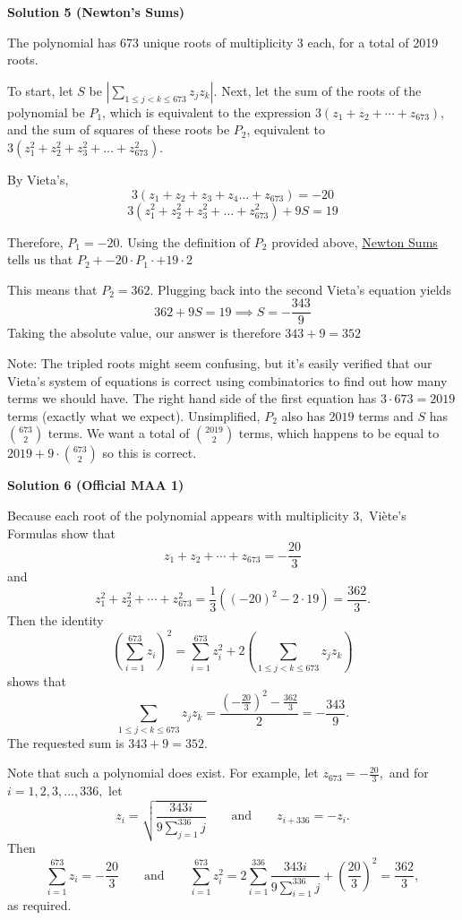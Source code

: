 \begin{enumerate}
\textbf{Solution 5 (Newton's Sums)}

The polynomial has 673 unique roots of multiplicity 3 each, for a total of 2019 roots.

 To start, let $S$ be $\left| \sum_{1 \le j <k \le 673} z_jz_k \right|$. Next, let the sum of the roots of the polynomial be $P_1$, which is equivalent to the expression $3(z_1+z_2+\cdots+z_{673})$, and the sum of squares of these roots be $P_2$, equivalent to $3(z_1^2+z_2^2+z_3^2+\dots+z_{673}^2)$.

 By Vieta's,
 \[3( z_1 + z_2 + z_3 + z_4 \dots + z_{673}) = -20\]
 \[3( z_1^2 + z_2^2 + z_3^2 + \dots + z_{673}^2) + 9S = 19\]

 Therefore, $P_1 = -20$. Using the definition of $P_2$ provided above, \href{https://artofproblemsolving.com/wiki/index.php?title=Newton\%27s\_Sums}{ Newton Sums} tells us that $P_2 + -20 \cdot P_1 \cdot + 19 \cdot 2$

 This means that $P_2 = 362$. Plugging back into the second Vieta's equation yields
 \[362 + 9S = 19 \implies S = -\frac{343}{9}\]Taking the absolute value, our answer is therefore $343 + 9 = \boxed{352}$

 
Note: The tripled roots might seem confusing, but it's easily verified that our Vieta's system of equations is correct using combinatorics to find out how many terms we should have. The right hand side of the first equation has $3\cdot673 = 2019$ terms (exactly what we expect). Unsimplified, $P_2$ also has $2019$ terms and $S$ has $\binom{673}{2}$ terms. We want a total of $\binom{2019}{2}$ terms, which happens to be equal to $2019 + 9\cdot\binom{673}{2}$ so this is correct. 

 



\textbf{Solution 6 (Official MAA 1)}

Because each root of the polynomial appears with multiplicity $3,$ Viète's Formulas show that 
 \[z_1+z_2+\cdots+z_{673}=-\frac{20}3\] and 
 \[z_1^2+z_2^2+\cdots+z_{673}^2 =\frac13\left((-20)^2-2\cdot19\right)=\frac{362}3.\] Then the identity 
 \[\left(\sum_{i=1}^{673}z_i\right)^2=\sum_{i=1}^{673}z_i^2+2\left(\sum_{1\le j<k\le 673}z_jz_k\right)\] shows that 
 \[\sum_{1\le j<k\le 673}z_jz_k=\frac{\left(-\frac{20}3\right)^2-\frac{362}3}{2}=-\frac{343}9.\] The requested sum is $343+9=352.$

 Note that such a polynomial does exist. For example, let $z_{673}=-\frac{20}3,$ and for $i=1,2,3,\dots,336,$ let 
 \[z_i=\sqrt{\frac{343i}{9\sum_{j=1}^{336}j}}\qquad \text{and}\qquad z_{i+336}=-z_i.\] Then 
 \[\sum_{i=1}^{673}z_i=-\frac{20}3\qquad\text{and}\qquad\sum_{i=1}^{673}z_i^2=2\sum_{i=1}^{336}\frac{343i}{9\sum_{i=1}^{336}j}+\left(\frac{20}3\right)^2=\frac{362}3,\] as required.


\end{enumerate}
